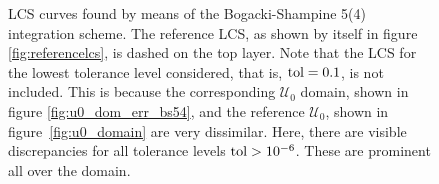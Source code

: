 \begin{figure}[htpb]
    \centering
    
    \caption[LCS curves found by means of the Bogacki-Shampine 5(4) integration
    scheme]{
        LCS curves found by means of the Bogacki-Shampine 5(4) integration
        scheme. The reference LCS, as shown by itself in figure
        \ref{fig:referencelcs}, is dashed on the top layer. Note that
        the LCS for the lowest tolerance level considered, that is,
        $\textnormal{tol}=0.1$, is not included. This is because the
        corresponding $\mathcal{U}_{0}$ domain, shown in figure
        \ref{fig:u0_dom_err_bs54}, and the reference $\mathcal{U}_{0}$, shown
        in figure~\ref{fig:u0_domain} are very dissimilar. Here, there are visible
        discrepancies for all tolerance levels $\textnormal{tol}>10^{-6}$.
        These are prominent all over the domain.}
    \label{fig:lcs_rkbs54}
\end{figure}
